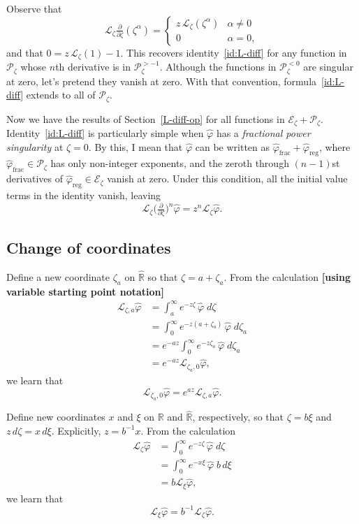 \documentclass{article}
\theoremstyle{plain}
\newcommand{\R}{\mathbb{R}}
\newcommand{\laplace}{\mathcal{L}}
\begin{document}
Observe that
\[ \laplace_\zeta\tfrac{\partial}{\partial \zeta}(\zeta^\alpha) = \begin{cases}
z\,\laplace_\zeta(\zeta^\alpha) & \alpha \neq 0 \\
0 & \alpha = 0,
\end{cases} \]
and that $0 = z\,\laplace_\zeta(1) - 1$. This recovers identity~\ref{id:L-diff} for any function in $\mathcal{P}_\zeta$ whose $n$th derivative is in $\mathcal{P}_\zeta^{> -1}$. Although the functions in $\mathcal{P}_\zeta^{< 0}$ are singular at zero, let's pretend they vanish at zero. With that convention, formula~\ref{id:L-diff} extends to all of $\mathcal{P}_\zeta$.

Now we have the results of Section~\ref{L-diff-op} for all functions in $\mathcal{E}_\zeta + \mathcal{P}_\zeta$. Identity~\ref{id:L-diff} is particularly simple when $\hat{\varphi}$ has a {\em fractional power singularity} at $\zeta = 0$. By this, I mean that $\hat{\varphi}$ can be written as $\hat{\varphi}_\text{frac} + \hat{\varphi}_\text{reg}$, where $\hat{\varphi}_\text{frac} \in \mathcal{P}_\zeta$ has only non-integer exponents, and the zeroth through $(n-1)$st derivatives of $\hat{\varphi}_\text{reg} \in \mathcal{E}_\zeta$ vanish at zero. Under this condition, all the initial value terms in the identity vanish, leaving
\[ \laplace_\zeta \big(\tfrac{\partial}{\partial \zeta}\big)^n \hat{\varphi} = z^n \laplace_\zeta \hat{\varphi}. \]
\color{black}
\subsection{Change of coordinates}\label{translation}
Define a new coordinate $\zeta_a$ on $\hat{\R}$ so that $\zeta = a + \zeta_a$. From the calculation \textbf{[using variable starting point notation]}
\begin{align*}
\laplace_{\zeta, a} \hat{\varphi} & = \int_a^\infty e^{-z \zeta}\,\hat{\varphi}\;d\zeta \\
& = \int_0^\infty e^{-z(a + \zeta_a)}\,\hat{\varphi}\;d\zeta_a \\
& = e^{-az} \int_0^\infty e^{-z\zeta_a}\,\hat{\varphi}\;d\zeta_a \\
& = e^{-az} \laplace_{\zeta_a, 0} \hat{\varphi},
\end{align*}
we learn that
\[ \laplace_{\zeta_a, 0} \hat{\varphi} = e^{az} \laplace_{\zeta, a} \hat{\varphi}. \]

Define new coordinates $x$ and $\xi$ on $\R$ and $\hat{\R}$, respectively, so that $\zeta = b\xi$ and $z\,d\zeta = x\,d\xi$. Explicitly, $z = b^{-1}x$. From the calculation
\begin{align*}
\laplace_\zeta \hat{\varphi} & = \int_0^\infty e^{-z \zeta}\,\hat{\varphi}\;d\zeta \\
& = \int_0^\infty e^{-x\xi}\,\hat{\varphi}\;b\,d\xi \\
& = b \laplace_\xi \hat{\varphi},
\end{align*}
we learn that
\[ \laplace_\xi \hat{\varphi} = b^{-1} \laplace_\zeta \hat{\varphi}. \]
\end{document}
